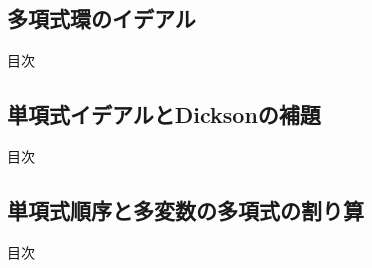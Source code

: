 \documentclass[aspectratio=169, dvipdfmx, 11pt]{beamer} %
\begin{document}
%
%
%

\subsection{多項式環のイデアル}
\begin{frame}{目次}
	\tableofcontents[currentsubsection]
\end{frame}



\subsection{単項式イデアルとDicksonの補題}
\begin{frame}{目次}
	\tableofcontents[currentsubsection]
\end{frame}



\subsection{単項式順序と多変数の多項式の割り算}
\begin{frame}{目次}
	\tableofcontents[currentsubsection]
\end{frame}


\end{document}
